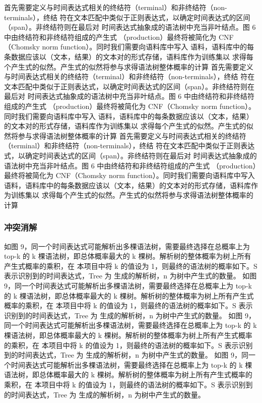 首先需要定义与时间表达式相关的终结符（terminal）和非终结符（non-terminals），终结
符在文本匹配中类似于正则表达式，以确定时间表达式的区间（span）。非终结符则在最后对
时间表达式抽象成的语法树中充当非叶结点。图 6 中由终结符和非终结符组成的产生式
（production）最终将被简化为 CNF（Chomsky norm function）。同时我们需要向语料库中写入
语料，语料库中的每条数据应该以（文本，结果）的文本对的形式存储，语料库作为训练集以
求得每个产生式的似然。产生式的似然将参与求得语法树整体概率的计算
首先需要定义与时间表达式相关的终结符（terminal）和非终结符（non-terminals），终结
符在文本匹配中类似于正则表达式，以确定时间表达式的区间（span）。非终结符则在最后对
时间表达式抽象成的语法树中充当非叶结点。图 6 中由终结符和非终结符组成的产生式
（production）最终将被简化为 CNF（Chomsky norm function）。同时我们需要向语料库中写入
语料，语料库中的每条数据应该以（文本，结果）的文本对的形式存储，语料库作为训练集以
求得每个产生式的似然。产生式的似然将参与求得语法树整体概率的计算
首先需要定义与时间表达式相关的终结符（terminal）和非终结符（non-terminals），终结
符在文本匹配中类似于正则表达式，以确定时间表达式的区间（span）。非终结符则在最后对
时间表达式抽象成的语法树中充当非叶结点。图 6 中由终结符和非终结符组成的产生式
（production）最终将被简化为 CNF（Chomsky norm function）。同时我们需要向语料库中写入
语料，语料库中的每条数据应该以（文本，结果）的文本对的形式存储，语料库作为训练集以
求得每个产生式的似然。产生式的似然将参与求得语法树整体概率的计算

\subsubsection{冲突消解}

如图 9，同一个时间表达式可能解析出多棵语法树，需要最终选择在总概率上为 top-k 的
k 棵语法树，即总体概率最大的 k 棵树。解析树的整体概率为树上所有产生式概率的乘积，在
本项目中将 k 的值设为 1，则最终的语法树的概率如下。S 表示识别到的时间表达式，Tree 为
生成的解析树，n 为树中产生式的数量。
如图 9，同一个时间表达式可能解析出多棵语法树，需要最终选择在总概率上为 top-k 的
k 棵语法树，即总体概率最大的 k 棵树。解析树的整体概率为树上所有产生式概率的乘积，在
本项目中将 k 的值设为 1，则最终的语法树的概率如下。S 表示识别到的时间表达式，Tree 为
生成的解析树，n 为树中产生式的数量。
如图 9，同一个时间表达式可能解析出多棵语法树，需要最终选择在总概率上为 top-k 的
k 棵语法树，即总体概率最大的 k 棵树。解析树的整体概率为树上所有产生式概率的乘积，在
本项目中将 k 的值设为 1，则最终的语法树的概率如下。S 表示识别到的时间表达式，Tree 为
生成的解析树，n 为树中产生式的数量。
如图 9，同一个时间表达式可能解析出多棵语法树，需要最终选择在总概率上为 top-k 的
k 棵语法树，即总体概率最大的 k 棵树。解析树的整体概率为树上所有产生式概率的乘积，在
本项目中将 k 的值设为 1，则最终的语法树的概率如下。S 表示识别到的时间表达式，Tree 为
生成的解析树，n 为树中产生式的数量。



